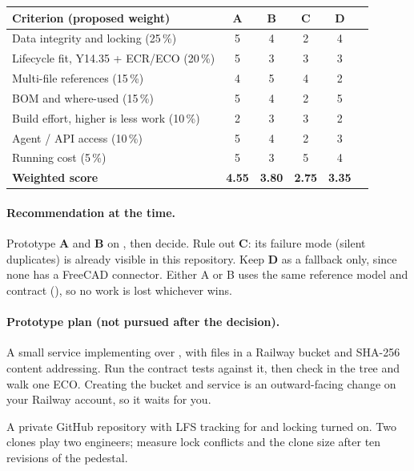 \begin{center}
\small
\begin{tabular}{@{}lccccc@{}}
\toprule
Criterion (proposed weight) & A & B & C & D\\
\midrule
Data integrity and locking (25\,\%) & 5 & 4 & 2 & 4\\
Lifecycle fit, Y14.35 + ECR/ECO (20\,\%) & 5 & 3 & 3 & 3\\
Multi-file references (15\,\%) & 4 & 5 & 4 & 2\\
BOM and where-used (15\,\%) & 5 & 4 & 2 & 5\\
Build effort, higher is less work (10\,\%) & 2 & 3 & 3 & 2\\
Agent / API access (10\,\%) & 5 & 4 & 2 & 3\\
Running cost (5\,\%) & 5 & 3 & 5 & 4\\
\midrule
\textbf{Weighted score} & \textbf{4.55} & \textbf{3.80} & \textbf{2.75} & \textbf{3.35}\\
\bottomrule
\end{tabular}
\end{center}

\paragraph{Recommendation at the time.} Prototype \textbf{A} and \textbf{B} on , then decide.
Rule out \textbf{C}: its failure mode (silent duplicates) is already visible in this repository. Keep \textbf{D}
as a fallback only, since none has a FreeCAD connector. Either A or B uses the same reference model and contract
(), so no work is lost whichever wins.

\paragraph{Prototype plan (not pursued after the decision).}
\begin{description}[leftmargin=0pt]
  \item[A.] A small service implementing  over , with files in
        a Railway bucket and SHA-256 content addressing. Run the contract tests against it, then check in the
         tree and walk one ECO. Creating the bucket and service is an outward-facing change on your
        Railway account, so it waits for you.
  \item[B.] A private GitHub repository with LFS tracking for  and locking turned on. Two clones
        play two engineers; measure lock conflicts and the clone size after ten revisions of the pedestal.
\end{description}

